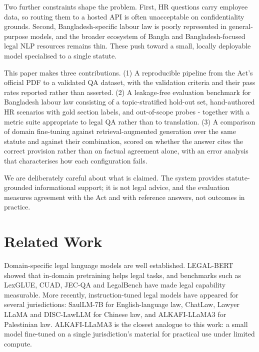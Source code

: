 \documentclass[11pt,a4paper]{article}
\begin{document}
Two further constraints shape the problem. First, HR questions carry employee data, so routing them to a hosted API is often unacceptable on confidentiality grounds. Second, Bangladesh-specific labour law is poorly represented in general-purpose models, and the broader ecosystem of Bangla and Bangladesh-focused legal NLP resources remains thin\cite{ref_banglabert,ref_ukil}. These push toward a small, locally deployable model specialised to a single statute.

This paper makes three contributions. (1) A reproducible pipeline from the Act's official PDF to a validated QA dataset, with the validation criteria and their pass rates reported rather than asserted. (2) A leakage-free evaluation benchmark for Bangladesh labour law consisting of a topic-stratified hold-out set, hand-authored HR scenarios with gold section labels, and out-of-scope probes - together with a metric suite appropriate to legal QA rather than to translation. (3) A comparison of domain fine-tuning against retrieval-augmented generation\cite{ref_rag} over the same statute and against their combination, scored on whether the answer cites the correct provision rather than on factual agreement alone, with an error analysis that characterises how each configuration fails.

We are deliberately careful about what is claimed. The system provides statute-grounded informational support; it is not legal advice, and the evaluation measures agreement with the Act and with reference answers, not outcomes in practice.
\section{Related Work}
Domain-specific legal language models are well established. LEGAL-BERT\cite{ref_legalbert} showed that in-domain pretraining helps legal tasks, and benchmarks such as LexGLUE\cite{ref_lexglue}, CUAD\cite{ref_cuad}, JEC-QA\cite{ref_jecqa} and LegalBench\cite{ref_legalbench} have made legal capability measurable. More recently, instruction-tuned legal models have appeared for several jurisdictions: SaulLM-7B\cite{ref_saullm} for English-language law, ChatLaw\cite{ref_chatlaw}, Lawyer LLaMA\cite{ref_lawyerllama} and DISC-LawLLM\cite{ref_disclaw} for Chinese law, and ALKAFI-LLaMA3\cite{ref_alkafi} for Palestinian law. ALKAFI-LLaMA3 is the closest analogue to this work: a small model fine-tuned on a single jurisdiction's material for practical use under limited compute.
\end{document}
